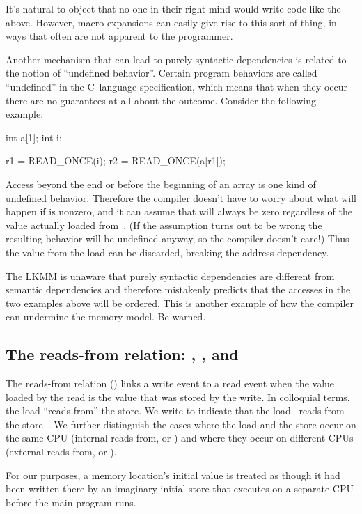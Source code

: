 It's natural to object that no one in their right mind would write
code like the above.
However, macro expansions can easily give rise to this sort of thing,
in ways that often are not apparent to the programmer.

Another mechanism that can lead to purely syntactic dependencies is
related to the notion of ``undefined behavior''.
Certain program behaviors are called ``undefined'' in the C~language
specification, which means that when they occur there are no
guarantees at all about the outcome.
Consider the following example:

\begin{VerbatimU}
	int a[1];
	int i;

	r1 = READ_ONCE(i);
	r2 = READ_ONCE(a[r1]);
\end{VerbatimU}

Access beyond the end or before the beginning of an array is one kind
of undefined behavior.
Therefore the compiler doesn't have to worry about what will happen
if  is nonzero, and it can assume that  will always be
zero regardless of the value actually loaded from~.
(If the assumption turns out to be wrong the resulting behavior will
be undefined anyway, so the compiler doesn't care!)
Thus the value from the load can be discarded, breaking the address
dependency.

The LKMM is unaware that purely syntactic dependencies are different
from semantic dependencies and therefore mistakenly predicts that the
accesses in the two examples above will be ordered.
This is another example of how the compiler can undermine the memory
model.
Be warned.


\subsection{The reads-from relation: , , and }
\label{sec:docs:explanation:The Reads-from Relation: rf, rfi, and rfe}

The reads-from relation () links a write event to a read event when
the value loaded by the read is the value that was stored by the
write.
In colloquial terms, the load ``reads from'' the store.
We write  to indicate that the load~ reads from
the store~.
We further distinguish the cases where the load and the store occur on
the same CPU (internal reads-from, or ) and where they occur on
different CPUs (external reads-from, or ).

For our purposes, a memory location's initial value is treated as
though it had been written there by an imaginary initial store that
executes on a separate CPU before the main program runs.

